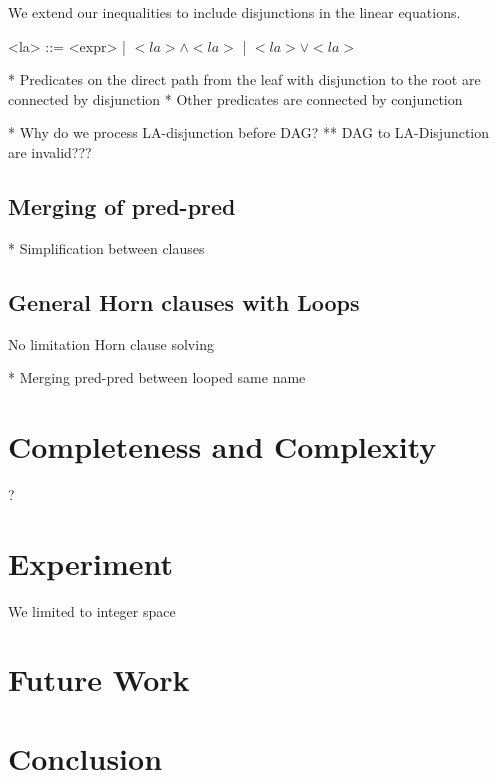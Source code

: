 \documentclass{llncs}
\begin{document}
We extend our inequalities to include disjunctions in the linear
equations.

\setlength{\grammarindent}{2em}
\begin{grammar}
<la> ::= <expr> | $<la> \wedge <la>$ | $<la> \vee <la>$
\end{grammar}

* Predicates on the direct path from the leaf with disjunction to the
root are connected by disjunction
* Other predicates are connected by conjunction


* Why do we process LA-disjunction before DAG?
** DAG to LA-Disjunction are invalid???


\subsection{Merging of pred-pred}

* Simplification between clauses


\subsection{General Horn clauses with Loops}

No limitation Horn clause solving

* Merging pred-pred between looped same name


\section{Completeness and Complexity}

?

\section{Experiment}

We limited to integer space

\section{Future Work}
\section{Conclusion}



\end{document}

